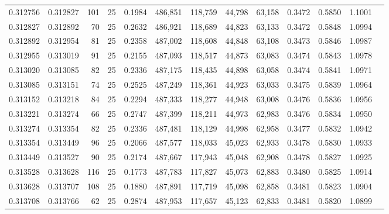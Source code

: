 \begin{tabular}{rrrrrrrrrrrrr}
0.312756 & 0.312827 &   101 &  25 &                                     0.1984 & 486,851 & 118,759 &  44,798 &  63,158 & 0.3472 & 0.5850 & 1.1001 \\
0.312827 & 0.312892 &    70 &  25 &                                     0.2632 & 486,921 & 118,689 &  44,823 &  63,133 & 0.3472 & 0.5848 & 1.0994 \\
0.312892 & 0.312954 &    81 &  25 &                                     0.2358 & 487,002 & 118,608 &  44,848 &  63,108 & 0.3473 & 0.5846 & 1.0987 \\
0.312955 & 0.313019 &    91 &  25 &                                     0.2155 & 487,093 & 118,517 &  44,873 &  63,083 & 0.3474 & 0.5843 & 1.0978 \\
0.313020 & 0.313085 &    82 &  25 &                                     0.2336 & 487,175 & 118,435 &  44,898 &  63,058 & 0.3474 & 0.5841 & 1.0971 \\
0.313085 & 0.313151 &    74 &  25 &                                     0.2525 & 487,249 & 118,361 &  44,923 &  63,033 & 0.3475 & 0.5839 & 1.0964 \\
0.313152 & 0.313218 &    84 &  25 &                                     0.2294 & 487,333 & 118,277 &  44,948 &  63,008 & 0.3476 & 0.5836 & 1.0956 \\
0.313221 & 0.313274 &    66 &  25 &                                     0.2747 & 487,399 & 118,211 &  44,973 &  62,983 & 0.3476 & 0.5834 & 1.0950 \\
0.313274 & 0.313354 &    82 &  25 &                                     0.2336 & 487,481 & 118,129 &  44,998 &  62,958 & 0.3477 & 0.5832 & 1.0942 \\
0.313354 & 0.313449 &    96 &  25 &                                     0.2066 & 487,577 & 118,033 &  45,023 &  62,933 & 0.3478 & 0.5830 & 1.0933 \\
0.313449 & 0.313527 &    90 &  25 &                                     0.2174 & 487,667 & 117,943 &  45,048 &  62,908 & 0.3478 & 0.5827 & 1.0925 \\
0.313528 & 0.313628 &   116 &  25 &                                     0.1773 & 487,783 & 117,827 &  45,073 &  62,883 & 0.3480 & 0.5825 & 1.0914 \\
0.313628 & 0.313707 &   108 &  25 &                                     0.1880 & 487,891 & 117,719 &  45,098 &  62,858 & 0.3481 & 0.5823 & 1.0904 \\
0.313708 & 0.313766 &    62 &  25 &                                     0.2874 & 487,953 & 117,657 &  45,123 &  62,833 & 0.3481 & 0.5820 & 1.0899 \\

\end{tabular}
